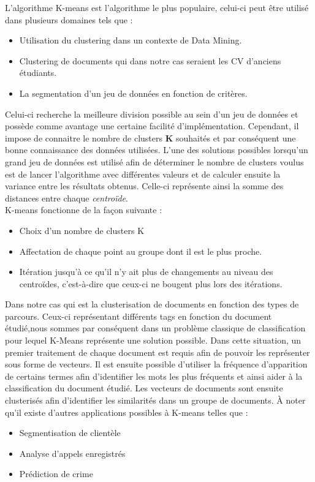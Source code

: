 \documentclass[memoire.tex]{subfiles}
\begin{document}
L'algorithme K-means est l'algorithme le plus populaire, celui-ci peut être utilisé dans plusieurs domaines tels que : 
\begin{itemize}
\item Utilisation du clustering dans un contexte de Data Mining.
\item Clustering de documents qui dans notre cas seraient les CV d'anciens étudiants.
\item La segmentation d'un jeu de données en fonction de critères.
\end{itemize}
Celui-ci recherche la meilleure division possible au sein d'un jeu de données \cite{ref5} et possède comme avantage une certaine facilité d'implémentation. Cependant, il impose de connaitre le nombre de clusters \textbf{K} souhaités et par conséquent une bonne connaissance des données utilisées. L'une des solutions possibles lorsqu'un grand jeu de données est utilisé afin de déterminer le nombre de clusters voulus est de lancer l'algorithme avec différentes valeurs et de calculer ensuite la variance entre les résultats obtenus. Celle-ci représente ainsi la somme des distances entre chaque \textit{centroïde}.\\
K-means fonctionne de la façon suivante : 
\begin{itemize}
\item Choix d'un nombre de clusters K
\item Affectation de chaque point au groupe dont il est le plus proche.
\item Itération jusqu'à ce qu'il n'y ait plus de changements au niveau des centroïdes, c'est-à-dire que ceux-ci ne bougent plus lors des itérations.
\end{itemize}
Dans notre cas qui est la clusterisation de documents en fonction des types de parcours. Ceux-ci représentant différents tags en fonction du document étudié,nous sommes par conséquent dans un problème classique de classification pour lequel K-Means représente une solution possible. Dans cette situation, un premier traitement de chaque document est requis afin de pouvoir les représenter sous forme de vecteurs. Il est ensuite possible d'utiliser la fréquence d'apparition de certains termes afin d'identifier les mots les plus fréquents et ainsi aider à la classification du document étudié. Les vecteurs de documents sont ensuite clusterisés afin d'identifier les similarités dans un groupe de documents. À noter qu'il existe d'autres applications possibles à K-means telles que : \begin{itemize}
\item Segmentisation de clientèle
\item Analyse d'appels enregistrés
\item Prédiction de crime \cite{ref15}
\end{itemize}
\end{document}
